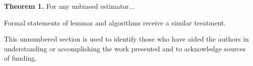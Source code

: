 \documentclass[]{spie}  %
\begin{document}
\noindent\textbf{Theorem 1.} For any unbiased estimator...

Formal statements of lemmas and algorithms receive a similar treatment.

\acknowledgments %
 
This unnumbered section is used to identify those who have aided the authors in understanding or accomplishing the work presented and to acknowledge sources of funding.  

\end{document}
